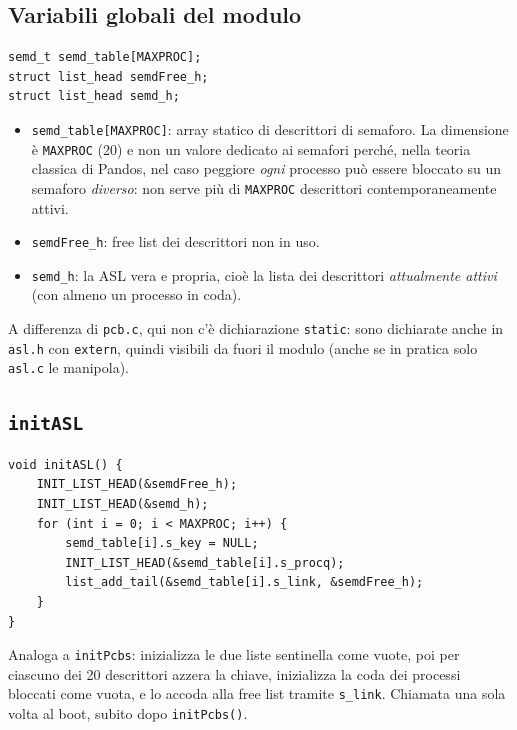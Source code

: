 \documentclass[11pt,a4paper]{article}
\newcommand{\code}[1]{\texttt{#1}}
\newcommand{\func}[1]{\textbf{\texttt{#1}}}
\begin{document}
\subsection{Variabili globali del modulo}
\begin{lstlisting}
semd_t semd_table[MAXPROC];
struct list_head semdFree_h;
struct list_head semd_h;
\end{lstlisting}
\begin{itemize}
\item \code{semd\_table[MAXPROC]}: array statico di descrittori di
  semaforo. La dimensione è \code{MAXPROC} (20) e non un valore dedicato ai
  semafori perché, nella teoria classica di Pandos, nel caso peggiore
  \emph{ogni} processo può essere bloccato su un semaforo \emph{diverso}: non
  serve più di \code{MAXPROC} descrittori contemporaneamente attivi.
\item \code{semdFree\_h}: free list dei descrittori non in uso.
\item \code{semd\_h}: la ASL vera e propria, cioè la lista dei descrittori
  \emph{attualmente attivi} (con almeno un processo in coda).
\end{itemize}
A differenza di \code{pcb.c}, qui non c'è dichiarazione \code{static}: sono
dichiarate anche in \code{asl.h} con \code{extern}, quindi visibili da fuori
il modulo (anche se in pratica solo \code{asl.c} le manipola).

\subsection{\func{initASL}}
\begin{lstlisting}
void initASL() {
    INIT_LIST_HEAD(&semdFree_h);
    INIT_LIST_HEAD(&semd_h);
    for (int i = 0; i < MAXPROC; i++) {
        semd_table[i].s_key = NULL;
        INIT_LIST_HEAD(&semd_table[i].s_procq);
        list_add_tail(&semd_table[i].s_link, &semdFree_h);
    }
}
\end{lstlisting}
Analoga a \code{initPcbs}: inizializza le due liste sentinella come vuote,
poi per ciascuno dei 20 descrittori azzera la chiave, inizializza la coda dei
processi bloccati come vuota, e lo accoda alla free list tramite
\code{s\_link}. Chiamata una sola volta al boot, subito dopo
\code{initPcbs()}.
\end{document}
